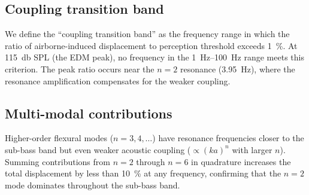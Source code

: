 \subsection{Coupling transition band}
\label{sec:transition-band}

We define the ``coupling transition band'' as the frequency range in
which the ratio of airborne-induced displacement to perception threshold
exceeds \SI{1}{\percent}.  At \SI{115}{\decibel} SPL (the EDM peak),
no frequency in the \SIrange{1}{100}{\hertz} range meets this
criterion.  The peak ratio occurs near the $n = 2$ resonance
(\SI{3.95}{\hertz}), where the resonance amplification compensates
for the weaker coupling.

\subsection{Multi-modal contributions}
\label{sec:multimodal}

Higher-order flexural modes ($n = 3, 4, \ldots$) have resonance
frequencies closer to the sub-bass band but even weaker acoustic
coupling ($\propto (ka)^n$ with larger $n$).  Summing contributions from
$n = 2$ through $n = 6$ in quadrature increases the total displacement
by less than \SI{10}{\percent} at any frequency, confirming that the
$n = 2$ mode dominates throughout the sub-bass band.